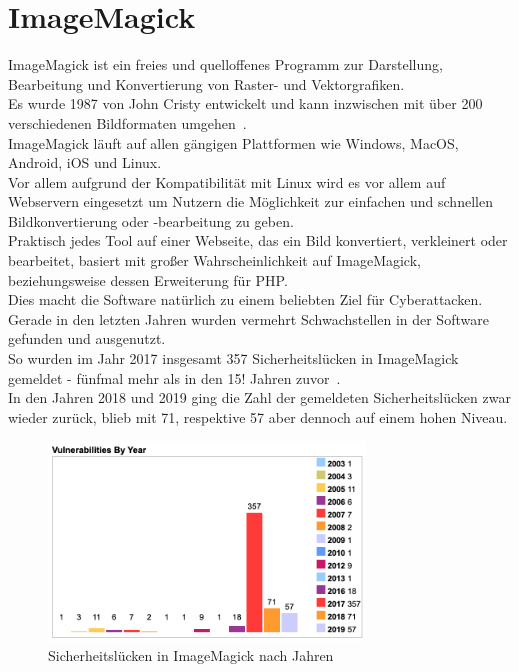 \section{ImageMagick}\label{sec:imagemagick}

ImageMagick ist ein freies und quelloffenes Programm zur Darstellung, Bearbeitung und Konvertierung von Raster- und Vektorgrafiken.\\
Es wurde 1987 von John Cristy entwickelt und kann inzwischen mit über 200 verschiedenen Bildformaten umgehen~\cite{ImageMagick2020}.\\

ImageMagick läuft auf allen gängigen Plattformen wie Windows, MacOS, Android, iOS und Linux.\\

Vor allem aufgrund der Kompatibilität mit Linux wird es vor allem auf Webservern eingesetzt um Nutzern die Möglichkeit zur einfachen und schnellen Bildkonvertierung oder -bearbeitung zu geben.\\
Praktisch jedes Tool auf einer Webseite, das ein Bild konvertiert, verkleinert oder bearbeitet, basiert mit großer Wahrscheinlichkeit auf ImageMagick, beziehungsweise dessen Erweiterung für PHP.\\

Dies macht die Software natürlich zu einem beliebten Ziel für Cyberattacken.\\
Gerade in den letzten Jahren wurden vermehrt Schwachstellen in der Software gefunden und ausgenutzt.\\

So wurden im Jahr 2017 insgesamt 357 Sicherheitslücken in ImageMagick gemeldet - fünfmal mehr als in den 15!
Jahren zuvor~\cite{ImagemagickProductsVulnerabilities}.\\
In den Jahren 2018 und 2019 ging die Zahl der gemeldeten Sicherheitslücken zwar wieder zurück, blieb mit 71, respektive 57 aber dennoch auf einem hohen Niveau.\\

\begin{figure}[!hb]
    \includegraphics[width=0.75\textwidth]{img/CVEDetailsVulnsYear.png}
    \caption{Sicherheitslücken in ImageMagick nach Jahren}
\end{figure}

